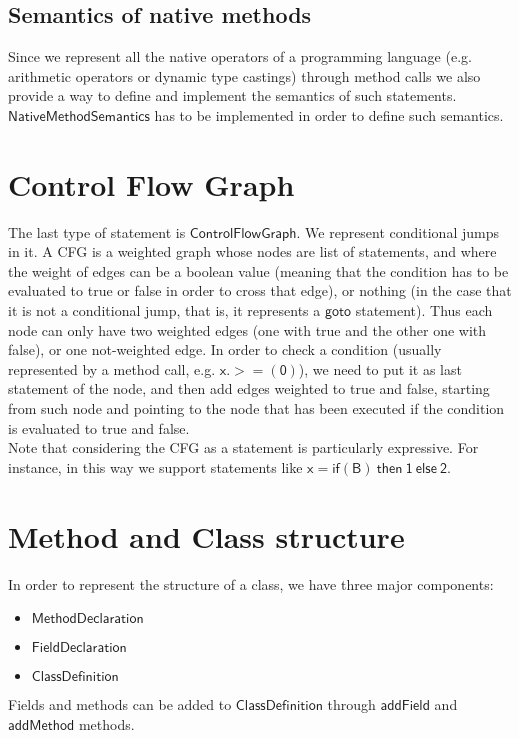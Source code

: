 \documentclass[11pt]{article}
\newcommand{\statement}[1]{\ensuremath{\mathsf{#1}}}
\begin{document}
\subsection{Semantics of native methods}
Since we represent all the native operators of a programming language (e.g. arithmetic operators or dynamic type castings) through method calls we also provide a way to define and implement the semantics of such statements. \statement{NativeMethodSemantics} has to be implemented in order to define such semantics.

\section{Control Flow Graph}
The last type of statement is \statement{ControlFlowGraph}. We represent conditional jumps in it. A CFG is a weighted graph whose nodes are list of statements, and where the weight of edges can be a boolean value (meaning that the condition has to be evaluated to true or false in order to cross that edge), or nothing (in the case that it is not a conditional jump, that is, it represents a \statement{goto} statement). Thus each node can only have two weighted edges (one with true and the other one with false), or one not-weighted edge. In order to check a condition (usually represented by a method call, e.g. \statement{x.>=(0)}), we need to put it as last statement of the node, and then add edges weighted to true and false, starting from such node and pointing to the node that has been executed if the condition is evaluated to true and false.\\
Note that considering the CFG as a statement is particularly expressive. For instance, in this way we support statements like \statement{x=if(B)\ then\ 1\ else\ 2}.

\section{Method and Class structure}
In order to represent the structure of a class, we have three major components:
\begin{itemize}
\item \statement{MethodDeclaration}
\item \statement{FieldDeclaration}
\item \statement{ClassDefinition}
\end{itemize}

Fields and methods can be added to \statement{ClassDefinition} through \statement{addField} and \statement{addMethod} methods.
\end{document}
